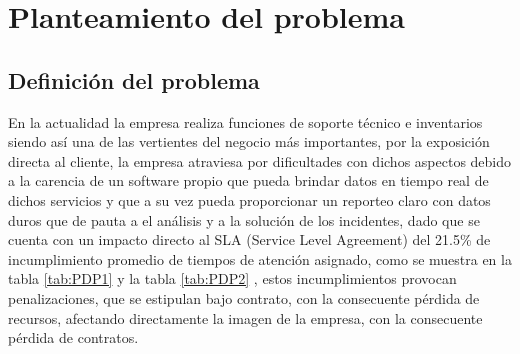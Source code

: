 

\chapter{Planteamiento del problema}


\section{Definición del problema}



En la actualidad la empresa realiza funciones de soporte técnico e inventarios  siendo así una de las vertientes del negocio más importantes, por la exposición directa al cliente, la empresa atraviesa  por dificultades con dichos  aspectos debido a la carencia de un software propio que pueda brindar datos en tiempo real de dichos servicios y que a su vez pueda proporcionar un reporteo claro  con datos duros que de pauta a el análisis y a la solución de los incidentes, dado que se cuenta con un impacto directo al SLA (Service Level Agreement) del 21.5\%  de incumplimiento promedio de tiempos de atención asignado, como se muestra en la tabla \ref{tab:PDP1} y la tabla \ref{tab:PDP2} ,  estos incumplimientos provocan penalizaciones, que se estipulan bajo contrato, con la consecuente pérdida de recursos, afectando directamente la imagen de la empresa, con la consecuente pérdida de contratos.


